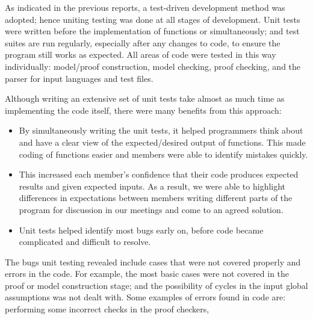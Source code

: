 As indicated in the previous reports, a test-driven development method was adopted; hence uniting testing was done at all stages of development. Unit tests were written before the implementation of functions or simultaneously; and test suites are run regularly, especially after any changes to code, to ensure the program still works as expected. All areas of code were tested in this way individually: model/proof construction, model checking, proof checking, and the parser for input languages and test files.

Although writing an extensive set of unit tests take almost as much time as implementing the code itself, there were many benefits from this approach:
\begin{itemize}
\item By simultaneously writing the unit tests, it helped programmers think about and have a clear view of the expected/desired output of functions. This made coding of functions easier and members were able to identify mistakes quickly.

\item This increased each member's confidence that their code produces expected results and given expected inputs. As a result, we were able to highlight differences in expectations between members writing different parts of the program for discussion in our meetings and come to an agreed solution.

\item Unit tests helped identify most bugs early on, before code became complicated and difficult to resolve.
\end{itemize}

The bugs unit testing revealed include cases that were not covered properly and errors in the code. For example, the most basic cases were not covered in the proof or model construction stage; and the possibility of cycles in the input global assumptions was not dealt with. Some examples of errors found in code are: performing some incorrect checks in the proof checkers,
